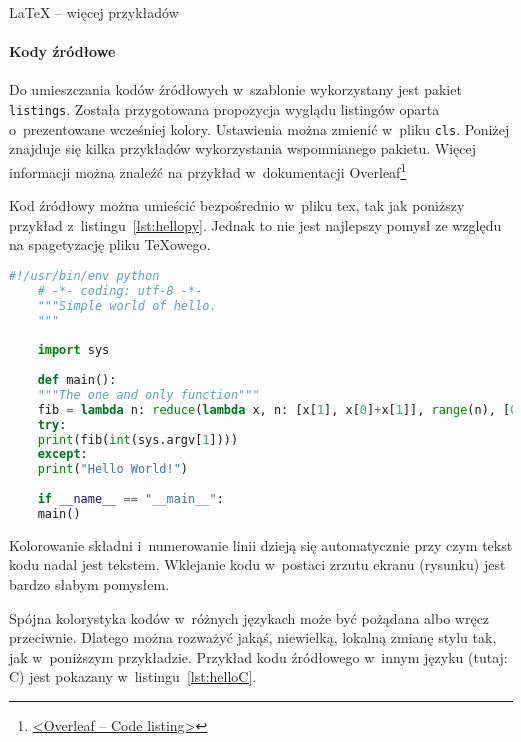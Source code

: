 \begin{easyappendix}{\LaTeX{} -- więcej przykładów}

\paragraph{Kody źródłowe}
Do umieszczania kodów źródłowych w~szablonie wykorzystany jest pakiet \texttt{listings}. Została przygotowana propozycja wyglądu listingów oparta o~prezentowane wcześniej kolory. Ustawienia można zmienić w~pliku \texttt{cls}. Poniżej znajduje się kilka przykładów wykorzystania wspomnianego pakietu. Więcej informacji można znaleźć na przykład w~dokumentacji Overleaf\footnote{\href{https://www.overleaf.com/learn/latex/code_listing}{<Overleaf -- Code listing>}}

Kod źródłowy można umieścić bezpośrednio w~pliku tex, tak jak poniższy przykład z~listingu~\ref{lst:hellopy}. Jednak to nie jest najlepszy pomysł ze względu na spagetyzację pliku \TeX{owego}.

\begin{lstlisting}[language=Python,
	caption={Prosty skrypt w~języku Python},
	label={lst:hellopy}]
	#!/usr/bin/env python
	# -*- coding: utf-8 -*-
	"""Simple world of hello.
	"""
	
	import sys
	
	def main():
	"""The one and only function"""
	fib = lambda n: reduce(lambda x, n: [x[1], x[0]+x[1]], range(n), [0, 1])[0]
	try:
	print(fib(int(sys.argv[1])))
	except:
	print("Hello World!")
	
	if __name__ == "__main__":
	main()
\end{lstlisting}

Kolorowanie składni i~numerowanie linii dzieją się automatycznie przy czym tekst kodu nadal jest tekstem.  Wklejanie kodu w~postaci zrzutu ekranu (rysunku) jest bardzo słabym pomysłem.

Spójna kolorystyka kodów w~różnych językach może być pożądana albo wręcz przeciwnie. Dlatego można rozważyć jakąś, niewielką, lokalną zmianę stylu tak, jak w~poniższym przykładzie. Przykład kodu źródłowego w~innym języku (tutaj: C) jest pokazany w~listingu~\ref{lst:helloC}. 


\end{easyappendix}
